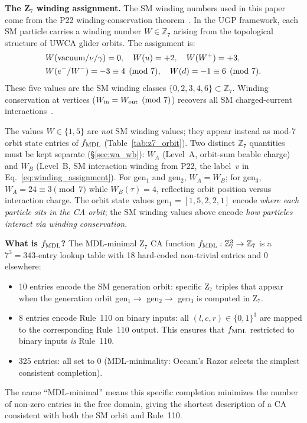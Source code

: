 \documentclass[11pt]{article}
\theoremstyle{remark}
\begin{document}
\textbf{The Z$_7$ winding assignment.}
The SM winding numbers used in this paper come from the P22 winding-conservation
theorem~\cite{Spivack2026_UGPDynamics}. In the UGP framework, each SM particle carries a winding
number $W \in \mathbb{Z}_7$ arising from the topological structure of UWCA glider orbits.
The assignment is:
\begin{align}
&W(\text{vacuum}/\nu/\gamma) = 0,\quad W(u) = +2,\quad W(W^+) = +3,\notag\\
&W(e^-/W^-) = -3 \equiv 4 \pmod 7,\quad W(d) = -1 \equiv 6 \pmod 7.
\label{eq:winding_assignment}
\end{align}
These five values are the SM winding classes $\{0,2,3,4,6\} \subset \mathbb{Z}_7$.
Winding conservation at vertices ($W_{\rm in} = W_{\rm out} \pmod 7$) recovers
all SM charged-current interactions~\cite{Spivack2026_UGPDynamics}.

The values $W \in \{1,5\}$ are \emph{not} SM winding values; they appear instead as
mod-7 orbit state entries of $f_{\rm MDL}$ (Table~\ref{tab:z7_orbit}).
Two distinct $\mathbb{Z}_7$ quantities must be kept separate (§\ref{sec:wa_wb}):
$W_A$ (Level~A, orbit-sum beable charge) and $W_B$ (Level~B, SM interaction winding from
P22, the label~$v$ in Eq.~\eqref{eq:winding_assignment}).
For gen$_1$ and gen$_2$, $W_A = W_B$; for gen$_3$, $W_A = 24 \equiv 3 \pmod{7}$ while
$W_B(\tau) = 4$, reflecting orbit position versus interaction charge.
The orbit state values gen$_1 = [1,5,2,2,1]$ encode \emph{where each particle sits in the CA orbit};
the SM winding values above encode \emph{how particles interact via winding conservation}.

\textbf{What is $f_{\rm MDL}$?}
The MDL-minimal Z$_7$ CA function $f_{\rm MDL}: \mathbb{Z}_7^3 \to \mathbb{Z}_7$ is a
$7^3 = 343$-entry lookup table with 18 hard-coded non-trivial entries and 0 elsewhere:
\begin{itemize}
\item 10 entries encode the SM generation orbit: specific Z$_7$ triples that appear
  when the generation orbit gen$_1 \to$ gen$_2 \to$ gen$_3$ is computed in Z$_7$.
\item 8 entries encode Rule~110 on binary inputs: all $(l,c,r) \in \{0,1\}^3$ are mapped
  to the corresponding Rule~110 output. This ensures that $f_{\rm MDL}$ restricted to
  binary inputs \emph{is} Rule~110.
\item 325 entries: all set to 0 (MDL-minimality: Occam's Razor selects the simplest
  consistent completion).
\end{itemize}
The name ``MDL-minimal'' means this specific completion minimizes the number of
non-zero entries in the free domain, giving the shortest description of a CA consistent
with both the SM orbit and Rule~110.
\end{document}
